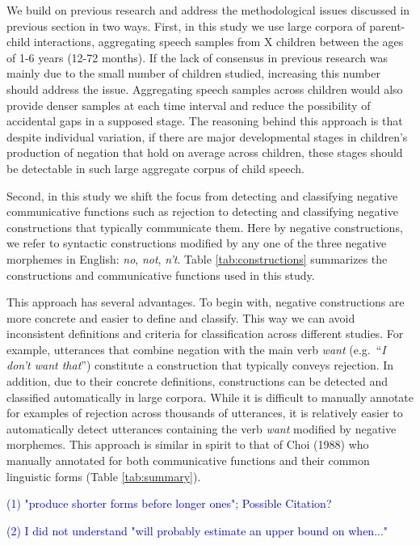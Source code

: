 \documentclass[
  english,
  man,floatsintext]{apa6}
\begin{document}
We build on previous research and address the methodological issues discussed in previous section in two ways. First, in this study we use large corpora of parent-child interactions, aggregating speech samples from X children between the ages of 1-6 years (12-72 months). If the lack of consensus in previous research was mainly due to the small number of children studied, increasing this number should address the issue. Aggregating speech samples across children would also provide denser samples at each time interval and reduce the possibility of accidental gaps in a supposed stage. The reasoning behind this approach is that despite individual variation, if there are major developmental stages in children's production of negation that hold on average across children, these stages should be detectable in such large aggregate corpus of child speech.

Second, in this study we shift the focus from detecting and classifying negative communicative functions such as rejection to detecting and classifying negative constructions that typically communicate them. Here by negative constructions, we refer to syntactic constructions modified by any one of the three negative morphemes in English: \emph{no}, \emph{not}, \emph{n't}. Table \ref{tab:constructions} summarizes the constructions and communicative functions used in this study.

This approach has several advantages. To begin with, negative constructions are more concrete and easier to define and classify. This way we can avoid inconsistent definitions and criteria for classification across different studies. For example, utterances that combine negation with the main verb \emph{want} (e.g.~``\emph{I don't want that}'') constitute a construction that typically conveys rejection. In addition, due to their concrete definitions, constructions can be detected and classified automatically in large corpora. While it is difficult to manually annotate for examples of rejection across thousands of utterances, it is relatively easier to automatically detect utterances containing the verb \emph{want} modified by negative morphemes. This approach is similar in spirit to that of Choi (1988) who manually annotated for both communicative functions and their common linguistic forms (Table \ref{tab:summary}).

\textcolor{blue}{(1) "produce shorter forms before longer ones"; Possible Citation?}

\textcolor{blue}{(2) I did not understand "will probably estimate an upper bound on when..."}
\end{document}
